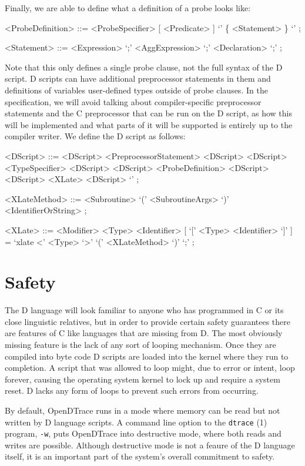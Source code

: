 \noindent
Finally, we are able to define what a definition of a probe looks like:
\begin{grammar}
<ProbeDefinition> ::= <ProbeSpecifier> [ <Predicate> ] `{'  \{ <Statement> \} `}' ;

<Statement> ::=  <Expression> `;'
            \alt <AggExpression> `;'
            \alt <Declaration> `;' ;
\end{grammar}

\noindent
Note that this only defines a single probe clause, not the full syntax of the D script.
D scripts can have additional preprocessor statements in them and definitions of variables
user-defined types outside of probe clauses. In the specification, we will avoid talking about
compiler-specific preprocessor statements and the C preprocessor that can be run on the D
script, as how this will be implemented and what parts of it will be supported is entirely
up to the compiler writer. We define the D script as follows:
\begin{grammar}
<DScript> ::=  <DScript> <PreprocessorStatement> <DScript>
          \alt <DScript> <TypeSpecifier> <DScript>
          \alt <DScript> <ProbeDefinition> <DScript>
          \alt <DScript> <XLate>  <DScript>
          \alt `' ;

<XLateMethod> ::=  <Subroutine> `(' <SubroutineArgs> `)'
              \alt <IdentifierOrString> ;

<XLate> ::= <Modifier> <Type> <Identifier> [ `[' <Type> <Identifier> `]' ] = `xlate <' <Type> `>' `(' <XLateMethod> `)' `;' ;
\end{grammar}

\section{Safety}
\label{sec:safety}

The D language will look familiar to anyone who has programmed in C or
its close linguistic relatives, but in order to provide certain
safety guarantees there are features of C like languages that are
missing from D.  The most obviously missing feature is the lack of any
sort of looping mechanism.  Once they are compiled into byte code D
scripts are loaded into the kernel where they run to completion.  A
script that was allowed to loop might, due to error or intent, loop
forever, causing the operating system kernel to lock up and require a
system reset. D lacks any form of loops to prevent such errors from
occurring.

By default, OpenDTrace runs in a mode where memory can be read but not
written by D language scripts.  A command line option to the \texttt{dtrace} (1)
program, \texttt{-w}, puts OpenDTrace into destructive mode, where both reads
and writes are possible.  Although destructive mode is not a feaure of
the D language itself, it is an important part of the system's overall
commitment to safety.

